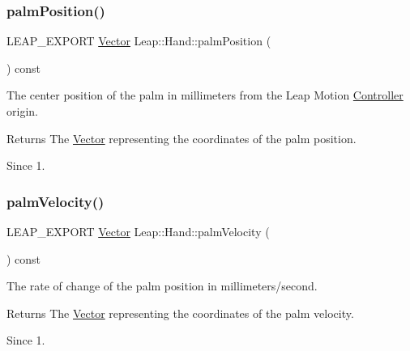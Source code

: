 \subsubsection{\texorpdfstring{palm\+Position()}{palmPosition()}}
{\footnotesize\ttfamily L\+E\+A\+P\+\_\+\+E\+X\+P\+O\+RT \hyperlink{struct_leap_1_1_vector}{Vector} Leap\+::\+Hand\+::palm\+Position (\begin{DoxyParamCaption}{ }\end{DoxyParamCaption}) const}

The center position of the palm in millimeters from the Leap Motion \hyperlink{class_leap_1_1_controller}{Controller} origin.


\begin{DoxyCodeInclude}
\end{DoxyCodeInclude}


\begin{DoxyReturn}{Returns}
The \hyperlink{struct_leap_1_1_vector}{Vector} representing the coordinates of the palm position. 
\end{DoxyReturn}
\begin{DoxySince}{Since}
1. 
\end{DoxySince}
\mbox{\label{class_leap_1_1_hand_a33dfe22cc108e346acc6ebcacebd122f}} 
\subsubsection{\texorpdfstring{palm\+Velocity()}{palmVelocity()}}
{\footnotesize\ttfamily L\+E\+A\+P\+\_\+\+E\+X\+P\+O\+RT \hyperlink{struct_leap_1_1_vector}{Vector} Leap\+::\+Hand\+::palm\+Velocity (\begin{DoxyParamCaption}{ }\end{DoxyParamCaption}) const}

The rate of change of the palm position in millimeters/second.


\begin{DoxyCodeInclude}
\end{DoxyCodeInclude}


\begin{DoxyReturn}{Returns}
The \hyperlink{struct_leap_1_1_vector}{Vector} representing the coordinates of the palm velocity. 
\end{DoxyReturn}
\begin{DoxySince}{Since}
1. 
\end{DoxySince}
\mbox{\label{class_leap_1_1_hand_ab9ed5affee0cc08226a3d334341b0496}} 
